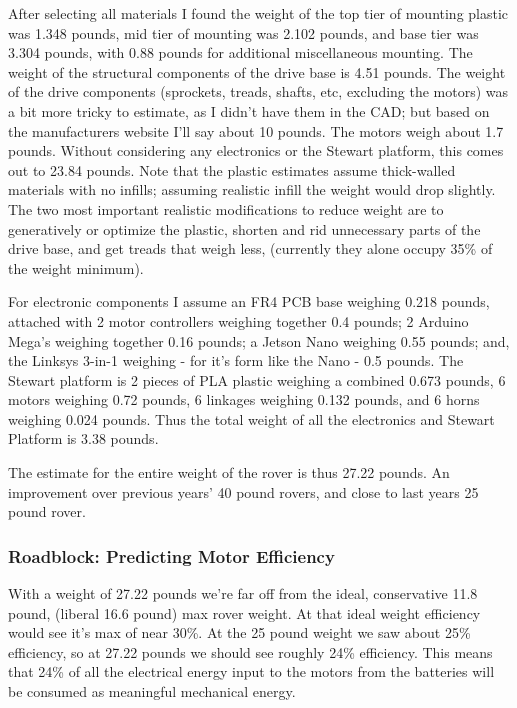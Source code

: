 \documentclass[a4paper, 10pt]{article}
\begin{document}
		After selecting all materials I found the weight of the top tier of mounting plastic was 1.348 pounds, mid tier of mounting was 2.102 pounds, and base tier was 3.304 pounds, with 0.88 pounds for additional miscellaneous mounting. The weight of the structural components of the drive base is 4.51 pounds. The weight of the drive components (sprockets, treads, shafts, etc, excluding the motors) was a bit more tricky to estimate, as I didn't have them in the CAD; but based on the manufacturers website I'll say about 10 pounds. The motors weigh about 1.7 pounds. Without considering any electronics or the Stewart platform, this comes out to 23.84 pounds. Note that the plastic estimates assume thick-walled materials with no infills; assuming realistic infill the weight would drop slightly. The two most important realistic modifications to reduce weight are to generatively or optimize the plastic, shorten and rid unnecessary parts of the drive base, and get treads that weigh less, (currently they alone occupy 35\% of the weight minimum). 
		
		For electronic components I assume an FR4 PCB base weighing 0.218 pounds, attached with 2 motor controllers weighing together 0.4 pounds; 2 Arduino Mega's weighing together 0.16 pounds; a Jetson Nano weighing 0.55 pounds; and, the Linksys 3-in-1 weighing - for it's form like the Nano - 0.5 pounds. The Stewart platform is 2 pieces of PLA plastic weighing a combined 0.673 pounds, 6 motors weighing 0.72 pounds, 6 linkages weighing 0.132 pounds, and 6 horns weighing 0.024 pounds. Thus the total weight of all the electronics and Stewart Platform is 3.38 pounds.
		
		The estimate for the entire weight of the rover is thus 27.22 pounds. An improvement over previous years' 40 pound rovers, and close to last years 25 pound rover. 
		
		
		\subsubsection{Roadblock: Predicting Motor Efficiency}
		With a weight of 27.22 pounds we're far off from the ideal, conservative 11.8 pound, (liberal 16.6 pound) max rover weight. At that ideal weight efficiency would see it's max of near 30\%. At the 25 pound weight we saw about 25\% efficiency, so at 27.22 pounds we should see roughly 24\% efficiency. This means that 24\% of all the electrical energy input to the motors from the batteries will be consumed as meaningful mechanical energy.
		
\end{document}
